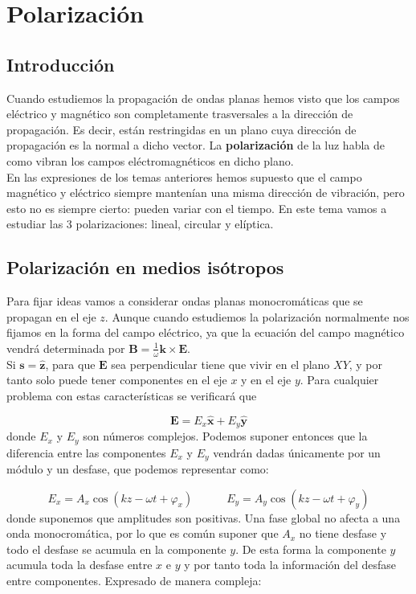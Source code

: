 \documentclass[12pt]{article}
\newcommand{\tquad}{\quad \quad \quad}
\newcommand{\Bn}{\mathbf{B}}
\newcommand{\En}{\mathbf{E}}
\newcommand{\kn}{\mathbf{k}}
\newcommand{\sn}{\mathbf{s}}
\newcommand{\hnz}{\hat{\mathbf{z}}}
\newcommand{\hnx}{\hat{\mathbf{x}}}
\newcommand{\hny}{\hat{\mathbf{y}}}
\numberwithin{equation}{section}
\numberwithin{figure}{section}
\begin{document}
\newpage

\section{Polarización}

\subsection{Introducción}

Cuando estudiemos la propagación de ondas planas hemos visto que los campos eléctrico y magnético son completamente trasversales a la dirección de propagación. Es decir, están restringidas en un plano cuya dirección de propagación es la normal a dicho vector. La \textbf{polarización} de la luz habla de como vibran los campos eléctromagnéticos en dicho plano. \\

En las expresiones de los temas anteriores hemos supuesto que el campo magnético y eléctrico siempre mantenían una misma dirección de vibración, pero esto no es siempre cierto: pueden variar con el tiempo. En este tema vamos a estudiar las 3 polarizaciones: lineal, circular y elíptica.

\subsection{Polarización en medios isótropos}

Para fijar ideas vamos a considerar ondas planas monocromáticas que se propagan en el eje $z$. Aunque cuando estudiemos la polarización normalmente nos fijamos en la forma del campo eléctrico, ya que la ecuación del campo magnético vendrá determinada por $\Bn = \frac{1}{\omega} \kn \times \En$.  \\

Si $\sn = \hnz$, para que $\En$ sea perpendicular tiene que vivir en el plano $XY$, y por tanto solo puede tener componentes en el eje $x$ y en el eje $y$. Para cualquier problema con estas características se verificará que

\begin{equation}
\En = E_x \hnx + E_y \hny
\end{equation}
donde $E_x$ y $E_y$ son números complejos. Podemos suponer entonces que la diferencia entre las componentes $E_x$ y $E_y$ vendrán dadas únicamente por un módulo y un desfase, que podemos representar como:

\begin{equation}
E_x = A_x \cos (kz-\omega t + \varphi_x) \tquad E_y = A_y \cos (kz - \omega t + \varphi_y)
\end{equation}
donde suponemos que amplitudes son positivas. Una fase global no afecta a una onda monocromática, por lo que es común suponer que $A_x$ no tiene desfase y todo el desfase se acumula en la componente $y$. De esta forma la componente $y$ acumula toda la desfase entre $x$ e $y$ y por tanto toda la información del desfase entre componentes. Expresado de manera compleja:
\end{document}
